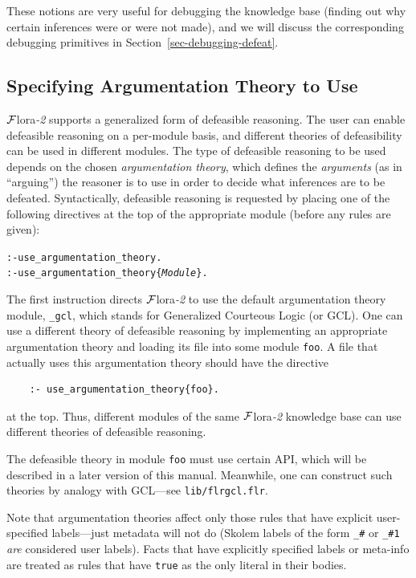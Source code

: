 \documentclass[11pt]{article}
\newcommand{\FLORA}{{\mbox{\sc ${\cal F}${lora}\rm\emph{-2}}}\xspace}
\begin{document}
These notions are very useful for debugging the knowledge base (finding out why
certain inferences were or were not made), and we will discuss the
corresponding debugging primitives in Section~\ref{sec-debugging-defeat}.


\subsection{Specifying Argumentation Theory to Use}

\FLORA supports a generalized form of defeasible reasoning.
The user can enable defeasible reasoning on a per-module basis, and
different theories of defeasibility can be used in different modules.
The type of defeasible reasoning to be used depends on the chosen
\emph{argumentation theory}, which defines the \emph{arguments} (as in
``arguing'') the reasoner is to use in order to decide what inferences
are to be defeated. Syntactically, defeasible reasoning is requested
by placing one of the following directives at the top of the
appropriate module (before any rules are given):

\begin{alltt}
  :- use_argumentation_theory.
  :- use_argumentation_theory\{\emph{Module}\}.
\end{alltt}
The first instruction directs \FLORA to use the default argumentation theory
module, {\tt \_gcl}, which stands for Generalized Courteous Logic (or GCL).
One can use a different theory of defeasible reasoning by implementing an
appropriate argumentation theory and
loading its file into some module {\tt foo}.
A file that actually uses this argumentation theory should have
the directive
\begin{verbatim}
    :- use_argumentation_theory{foo}.
\end{verbatim}
at the top. Thus, different modules of the same \FLORA
knowledge base can use different theories of defeasible reasoning.

The defeasible theory in module {\tt foo} must use certain API, which will
be described in a later version of this manual. Meanwhile, one can
construct such theories by analogy with GCL---see {\tt lib/flrgcl.flr}.  

Note that argumentation theories affect only those rules that have explicit
user-specified labels---just metadata will not do (Skolem labels of the
form {\tt \_\#} or {\tt \_\#1} \emph{are} considered user labels). Facts
that have explicitly specified labels or meta-info are treated as rules
that have {\tt true} as the only literal in their bodies.
\end{document}
